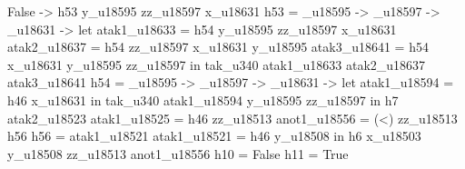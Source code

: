                                                                                                                                                                            False ->
                                                                                                                                                                             h53 y_u18595 zz_u18597 x_u18631
                                                                                                                        h53 = \y_u18595 -> \zz_u18597 -> \x_u18631 -> let
                                                                                                                                                                        atak1_u18633 = h54 y_u18595 zz_u18597 x_u18631
                                                                                                                                                                        atak2_u18637 = h54 zz_u18597 x_u18631 y_u18595
                                                                                                                                                                        atak3_u18641 = h54 x_u18631 y_u18595 zz_u18597
                                                                                                                                                                      in tak_u340 atak1_u18633 atak2_u18637 atak3_u18641
                                                                                                                        h54 = \y_u18595 -> \zz_u18597 -> \x_u18631 -> let
                                                                                                                                                                        atak1_u18594 = h46 x_u18631
                                                                                                                                                                      in tak_u340 atak1_u18594 y_u18595 zz_u18597
                                                                                                                      in h7 atak2_u18523
                                                        atak1_u18525 = h46 zz_u18513
                                                        anot1_u18556 = (<) zz_u18513 h56
                                                        h56 = atak1_u18521
                                                        atak1_u18521 = h46 y_u18508
                                                      in h6 x_u18503 y_u18508 zz_u18513 anot1_u18556
         h10 = False
         h11 = True
